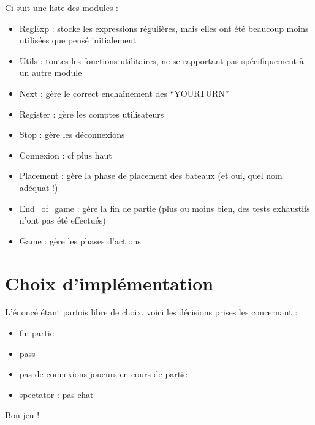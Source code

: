 \documentclass[a4paper, 11pt]{report}
\begin{document}
Ci-suit une liste des modules :
\begin{itemize}
\item RegExp : stocke les expressions régulières, mais elles ont été beaucoup moins utilisées que pensé initialement
\item Utils : toutes les fonctions utilitaires, ne se rapportant pas spécifiquement à un autre module
\item Next : gère le correct enchaînement des ``YOURTURN''
\item Register : gère les comptes utilisateurs
\item Stop : gère les déconnexions
\item Connexion : cf plus haut
\item Placement : gère la phase de placement des bateaux (et oui, quel nom adéquat !)
\item End\_of\_game : gère la fin de partie (plus ou moins bien, des tests exhaustifs n'ont pas été effectués)
\item Game : gère les phases d'actions
\end{itemize}

\section{Choix d'implémentation}
L'énoncé étant parfois libre de choix, voici les décisions prises les
concernant :
 \begin{itemize}
\item fin partie
\item pass
\item pas de connexions joueurs en cours de partie
\item spectator : pas chat
\end{itemize}

Bon jeu !
\end{document}
